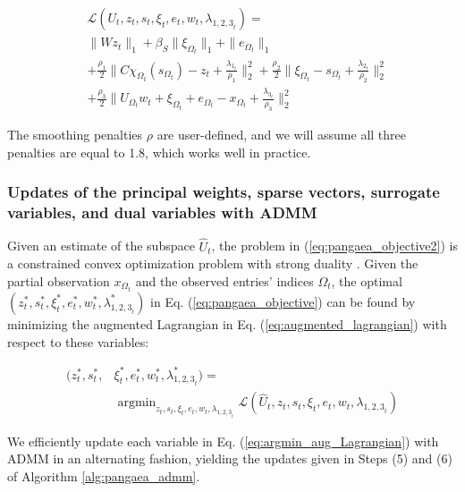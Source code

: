 \documentclass[10pt,twocolumn,letterpaper]{article}
\DeclareMathOperator*{\argmin}{argmin}
\begin{document}
\begin{equation}
\begin{split}
	&\mathcal{L}(U_t,z_t,s_t,\xi_t,e_t,w_t,\lambda_{{1,2,3}_t}) = \\
	& \|Wz_t\|_1 +  \beta_S\|\xi_{\Omega_t}\|_1 + \|e_{\Omega_t} \|_1 \\
	&+  \frac{\rho_1}{2}\|C\chi_{\Omega_t}(s_{\Omega_t}) - z_t + \frac{\lambda_{1_t}}{\rho_1}\|_2^2 + \frac{\rho_2}{2} \|\xi_{\Omega_t} - s_{\Omega_t} + \frac{\lambda_{2_t}}{\rho_2} \|^2_2  \\
	&+ \frac{\rho_3}{2}\|U_{\Omega_t}w_t + \xi_{\Omega_t} + e_{\Omega_t} - x_{\Omega_t} + \frac{\lambda_{3_t}}{\rho_3}\|^2_2 \end{split}
	\label{eq:augmented_lagrangian}
\end{equation}

\noindent The smoothing penalties $\rho$ are user-defined, and we will assume all three penalties are equal to 1.8, which works well in practice.

\subsubsection{Updates of the principal weights, sparse vectors, surrogate variables, and dual variables with ADMM}

Given an estimate of the subspace $\hat{U}_t$, the problem in (\ref{eq:pangaea_objective2}) is a constrained convex optimization problem with strong duality \cite{boyd:cvx_opt}. Given the partial observation $x_{\Omega_t}$ and the observed entries’ indices $\Omega_t$, the optimal $(z_t^*, s_t^*,\xi_t^*,e_t^*,w_t^*,\lambda^*_{{1,2,3}_t})$ in Eq. (\ref{eq:pangaea_objective}) can be found by minimizing the augmented Lagrangian in Eq. (\ref{eq:augmented_lagrangian}) with respect to these variables:

\begin{equation}
\begin{split}
	(z_t^*, s_t^*,&\xi_t^*,e_t^*,w_t^*,\lambda^*_{{1,2,3}_t}) = \\
	 &\argmin_{z_t, s_t,\xi_t,e_t,w_t,\lambda_{{1,2,3}_t}} \mathcal{L}(\hat{U}_t, z_t, s_t,\xi_t,e_t,w_t,\lambda_{{1,2,3}_t})
\end{split}
\label{eq:argmin_aug_Lagrangian}
\end{equation}

We efficiently update each variable in Eq. (\ref{eq:argmin_aug_Lagrangian}) with ADMM in an alternating fashion, yielding the updates given in Steps (5) and (6) of Algorithm \ref{alg:pangaea_admm}.
\end{document}
